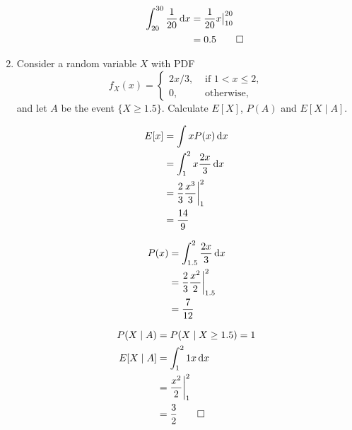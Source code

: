 \documentclass[paper=usletter, fontsize=12pt]{article}
\begin{document}
\begin{enumerate}
\begin{enumerate}
\begin{cproof}
                \begin{align*}
                    \int_{20}^{30} \frac{1}{20}\mathop{}\!\mathrm{d} x & = \frac{1}{20}x\big\vert_{10}^{20}\\
                    & = 0.5 \qedhere
                \end{align*}
                \endgroup

            \end{cproof}

        \end{enumerate}

        \item Consider a random variable $X$ with PDF
        \begin{equation*}
            f_X(x) = \begin{cases}
                2x/3, & \text{ if } 1 < x \le 2,\\
                0, & \text{ otherwise, }
            \end{cases}
        \end{equation*}
        and let $A$ be the event $\{X \ge 1.5\}$. Calculate $E[X]$, $P(A)$ and
        $E[X \mid A]$.
        \begin{cproof}

            \begin{align*}
                E[x] & = \int xP(x)\mathop{}\!\mathrm{d} x\\
                &= \int_{1}^{2}x\frac{2x}{3}\mathop{}\!\mathrm{d} x\\
                & = \frac{2}{3}\frac{x^3}{3}\bigg\vert_{1}^{2}\\
                & = \frac{14}{9}
            \end{align*}
            \endgroup

            \begin{align*}
                P(x) &= \int_{1.5}^{2}\frac{2x}{3}\mathop{}\!\mathrm{d} x\\
                & = \frac{2}{3}\frac{x^2}{2}\bigg\vert_{1.5}^{2}\\
                & = \frac{7}{12}
            \end{align*}
            \endgroup

            \begin{align*}
                P(X \mid A) &= P(X \mid X \ge 1.5) = 1\\
                E[X \mid A] &= \int_{1}^{2}1x\mathop{}\!\mathrm{d} x\\
                & = \frac{x^2}{2}\bigg\vert_{1}^{2}\\
                & = \frac{3}{2} \qedhere
            \end{align*}
            \endgroup


\end{cproof}
\end{enumerate}
\end{document}
